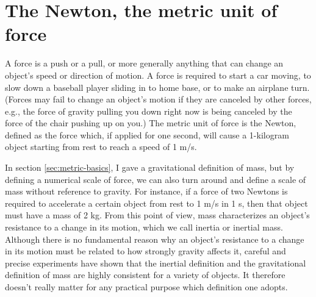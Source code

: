 \begin{center}
\end{center}


\section{The Newton, the metric unit of force}\label{sec:newton-unit}


A force is a push or a pull, or more generally anything that
can change an object's speed or direction of motion. A force
is required to start a car moving, to slow down a baseball
player sliding in to home base, or to make an airplane turn.
(Forces may fail to change an object's motion if they are
canceled by other forces, e.g., the force of gravity pulling
you down right now is being canceled by the force of the
chair pushing up on you.) The metric unit of force is the
Newton, defined as the force which, if applied for one
second, will cause a 1-kilogram object starting from rest to
reach a speed of 1 m/s. 


In section \ref{sec:metric-basics}, I gave a gravitational definition
of mass, but by defining a numerical scale of force, we can
also turn around and define a scale of mass without
reference to gravity. For instance, if a force of two
Newtons is required to accelerate a certain object from rest
to 1 m/s in 1 s, then that object must have a mass of 2
kg. From this point of view, mass characterizes an object's
resistance to a change in its motion, which we call inertia
or inertial mass. Although there is no fundamental reason
why an object's resistance to a change in its motion must be
related to how strongly gravity affects it, careful and
precise experiments have shown that the inertial definition
and the gravitational definition of mass are highly
consistent for a variety of objects. It therefore doesn't
really matter for any practical purpose which definition one adopts.


